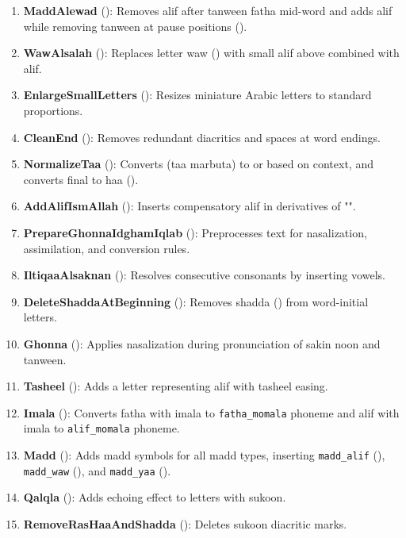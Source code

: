 \begin{enumerate}
    \item \textbf{MaddAlewad} (): Removes alif after tanween fatha mid-word and adds alif while removing tanween at pause positions ().
    
    \item \textbf{WawAlsalah} (): Replaces letter waw () with small alif above combined with alif.
    
    \item \textbf{EnlargeSmallLetters} (): Resizes miniature Arabic letters to standard proportions.
    
    \item \textbf{CleanEnd} (): Removes redundant diacritics and spaces at word endings.
    
    \item \textbf{NormalizeTaa} (): Converts  (taa marbuta) to  or  based on context, and converts final  to haa ().
    
    \item \textbf{AddAlifIsmAllah} (): Inserts compensatory alif in derivatives of "".
    
    \item \textbf{PrepareGhonnaIdghamIqlab} (): Preprocesses text for nasalization, assimilation, and conversion rules.
    
    \item \textbf{IltiqaaAlsaknan} (): Resolves consecutive consonants by inserting vowels.
    
    \item \textbf{DeleteShaddaAtBeginning} (): Removes shadda () from word-initial letters.
    
    \item \textbf{Ghonna} (): Applies nasalization during pronunciation of sakin noon and tanween.
    
    \item \textbf{Tasheel} (): Adds a letter representing alif with tasheel easing.
    
    \item \textbf{Imala} (): Converts fatha with imala to \texttt{fatha\_momala} phoneme and alif with imala to \texttt{alif\_momala} phoneme.
    
    \item \textbf{Madd} (): Adds madd symbols for all madd types, inserting \texttt{madd\_alif} (), \texttt{madd\_waw} (), and \texttt{madd\_yaa} ().
    
    \item \textbf{Qalqla} (): Adds echoing effect to  letters with sukoon.
    
    \item \textbf{RemoveRasHaaAndShadda} (): Deletes sukoon diacritic marks.
\end{enumerate}
